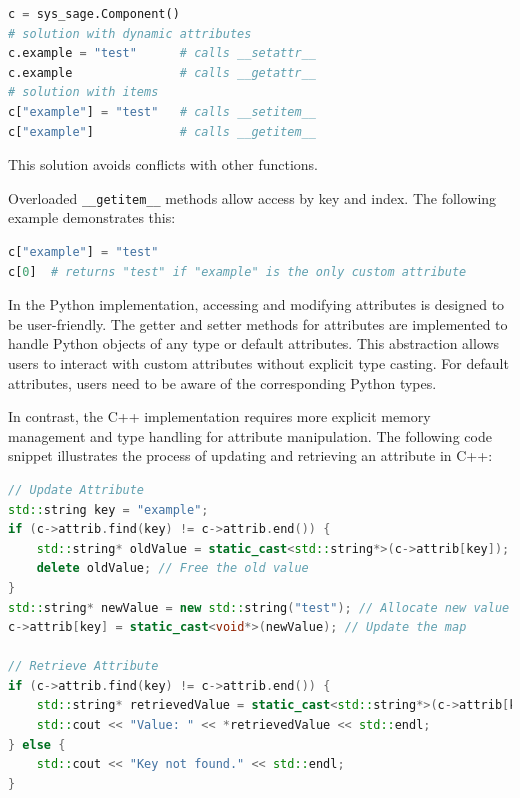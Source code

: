 \begin{lstlisting}[language=Python, xleftmargin=4em, frame = single]
c = sys_sage.Component()
# solution with dynamic attributes
c.example = "test"      # calls __setattr__
c.example               # calls __getattr__
# solution with items
c["example"] = "test"   # calls __setitem__
c["example"]            # calls __getitem__
\end{lstlisting}

This solution avoids conflicts with other functions.



Overloaded \verb|__getitem__| methods allow access by key and index. The following example demonstrates this:

\begin{lstlisting}[language=Python, xleftmargin=4em, frame = single]
c["example"] = "test"
c[0]  # returns "test" if "example" is the only custom attribute
\end{lstlisting}
In the Python implementation, accessing and modifying attributes is designed to be user-friendly. The getter and setter methods for attributes are implemented to handle Python objects of any type or default attributes. This abstraction allows users to interact with custom attributes without explicit type casting. For default attributes, users need to be aware of the corresponding Python types.

In contrast, the C++ implementation requires more explicit memory management and type handling for attribute manipulation. The following code snippet illustrates the process of updating and retrieving an attribute in C++:

\begin{lstlisting}[language=C++, xleftmargin=4em, frame = single]
// Update Attribute
std::string key = "example";
if (c->attrib.find(key) != c->attrib.end()) {
    std::string* oldValue = static_cast<std::string*>(c->attrib[key]);
    delete oldValue; // Free the old value
}
std::string* newValue = new std::string("test"); // Allocate new value
c->attrib[key] = static_cast<void*>(newValue); // Update the map

// Retrieve Attribute
if (c->attrib.find(key) != c->attrib.end()) {
    std::string* retrievedValue = static_cast<std::string*>(c->attrib[key]);
    std::cout << "Value: " << *retrievedValue << std::endl;
} else {
    std::cout << "Key not found." << std::endl;
}
\end{lstlisting}

